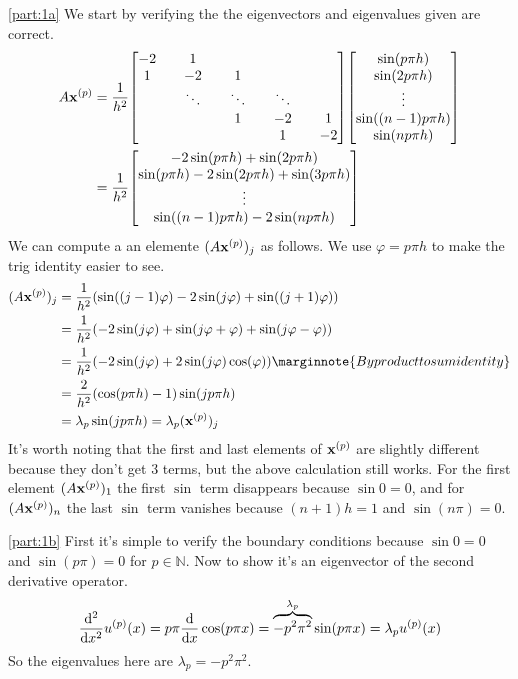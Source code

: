 \documentclass[boxes,pages]{homework}
\begin{document}
\begin{solution}
	\ref{part:1a}
	We start by verifying the the eigenvectors and eigenvalues given are correct.
	\begin{align*}
		A\vb{x}^{(p)} &= \frac{1}{h^2}\mqty[-2 && 1 && && && \\ 1 && -2 && 1 && && \\ && \ddots && \ddots && \ddots && \\ && && 1 && -2&&1\\ && && && 1&& -2]\mqty[\sin(p\pi h) \\ \sin(2p\pi h) \\ \vdots \\ \sin((n - 1)p\pi h) \\ \sin(np\pi h)] \\
		&= \frac{1}{h^2}\mqty[-2\sin(p\pi h) + \sin(2p\pi h) \\ \sin(p\pi h) - 2\sin(2p\pi h) + \sin(3p\pi h) \\ \vdots \\ \sin((n-1)p\pi h) - 2\sin(np\pi h)]
	\end{align*}
	We can compute a an elemente $(A\vb{x}^{(p)})_j$ as follows. We use $\varphi = p\pi h$ to make the trig identity easier to see.
	\begin{align*}
		(A\vb{x}^{(p)})_j & = \frac{1}{h^2}\qty(\sin((j - 1)\varphi) - 2\sin(j\varphi) + \sin((j + 1)\varphi))                           \\
		                  & = \frac{1}{h^2}\qty(-2\sin(j\varphi) + \sin(j\varphi + \varphi) + \sin(j\varphi - \varphi))                  \\
		                  & = \frac{1}{h^2}\qty(-2\sin(j\varphi) + 2\sin(j\varphi)\cos(\varphi)) \marginnote{By product to sum identity} \\
		                  & = \frac{2}{h^2}\qty(\cos(p\pi h) - 1)\sin(jp\pi h)                                                           \\
		                  & = \lambda_p\sin(jp\pi h) = \lambda_p(\vb{x}^{(p)})_j
	\end{align*}
	It's worth noting that the first and last elements of $\vb{x}^{(p)}$ are slightly different because they don't get 3 terms, but the above calculation still works. For the first element $(A\vb{x}^{(p)})_1$ the first $\sin$ term disappears because $\sin 0 = 0$, and for $(A\vb{x}^{(p)})_n$ the last $\sin$ term vanishes because $(n+1)h = 1$ and $\sin(n\pi) = 0$.

	\ref{part:1b}
	First it's simple to verify the boundary conditions because $\sin 0 = 0$ and $\sin(p\pi) = 0$ for $p\in\mathbb{N}$. Now to show it's an eigenvector of the second derivative operator.
	\begin{equation*}
		\dv[2]{x}u^{(p)}(x) = p\pi\dv{x}\cos(p\pi x) = \overbrace{-p^2\pi^2}^{\lambda_p}\sin(p\pi x) = \lambda_pu^{(p)}(x)
	\end{equation*}
	So the eigenvalues here are $\lambda_p = -p^2\pi^2$.


\end{solution}
\end{document}
